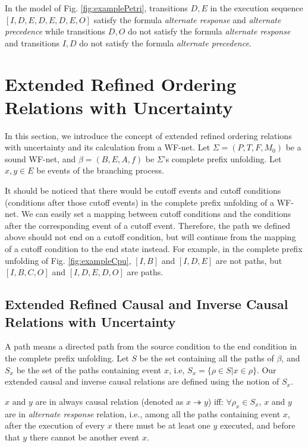\documentclass{llncs}
\begin{document}
\begin{example}\label{ex:relationFormulas}
In the model of Fig. \ref{fig:examplePetri}, transitions $D,E$ in the execution sequence $[I,D,E,D,E,D,E,O]$ satisfy the formula \textit{alternate response} and \textit{alternate precedence} while transitions $D,O$ do not satisfy the formula \textit{alternate response} and transitions $I,D$ do not satisfy the formula \textit{alternate precedence}.
\end{example}

\section{Extended Refined Ordering Relations with Uncertainty}\label{sec:relations}
In this section, we introduce the concept of extended refined ordering relations with uncertainty and its calculation from a WF-net. Let $\Sigma=(P,T,F,M_{0})$ be a sound WF-net, and $\beta=(B,E,A,f)$ be $\Sigma$'s complete prefix unfolding. Let $x,y\in E$ be events of the branching process.

It should be noticed that there would be cutoff events and cutoff conditions (conditions after those cutoff events) in the complete prefix unfolding of a WF-net. We can easily set a mapping between cutoff conditions and the conditions after the corresponding event of a cutoff event. Therefore, the path we defined above should not end on a cutoff condition, but will continue from the mapping of a cutoff condition to the end state instead. For example, in the complete prefix unfolding of Fig. \ref{fig:exampleCpu}, $[I,B]$ and $[I,D,E]$ are not paths, but $[I,B,C,O]$ and $[I,D,E,D,O]$ are paths.

\subsection{Extended Refined Causal and Inverse Causal Relations with Uncertainty}\label{subsec:causalAndInverseCausal}
A path means a directed path from the source condition to the end condition in the complete prefix unfolding. Let $S$ be the set containing all the paths of $\beta$, and $S_{x}$ be the set of the paths containing event $x$, i.e, $S_{x}=\{\rho\in S|x\in\rho\}$. Our extended causal and inverse causal relations are defined using the notion of $S_{x}$.

\begin{definition}\label{def:alwaysCausal}
$x$ and $y$ are in always causal relation (denoted as $x\twoheadrightarrow y$) iff: $\forall\rho_{x}\in S_{x}$, $x$ and $y$ are in \textit{alternate response} relation, i.e., among all the paths containing event $x$, after the execution of every $x$ there must be at least one $y$ executed, and before that $y$ there cannot be another event $x$.
\end{definition}
\end{document}
